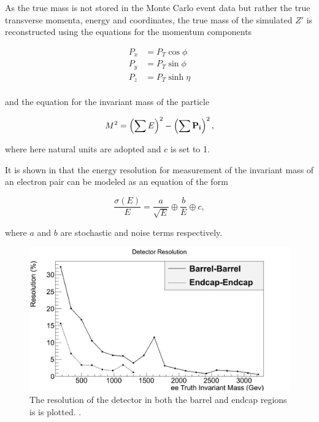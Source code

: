 \documentclass{article}
\begin{document}
As the true mass is not stored in the Monte Carlo event data but rather the true transverse momenta, energy and coordinates, the true mass of  the simulated $Z'$ is reconstructed using the equations for the momentum components

\begin{equation}
\begin{split}
P_x & = P_T \cos\phi \\
P_y & = P_T \sin\phi \\
P_z & = P_T\sinh\eta \\
\end{split}
\end{equation}

and the equation for the invariant mass of the particle

\begin{equation}
M^2 = \left(\sum E\right)^2 - \left(\sum \bf{P}_i\right)^2,
\end{equation}

where here natural units are adopted and $c$ is set to 1. 

It is shown in \cite{ATLASResolutionEquation} that the energy resolution for measurement of the invariant mass of an electron pair can be modeled as an equation of the form

\begin{equation}
\frac{\sigma(E)}{E} = \frac{a}{\sqrt{E}} \oplus \frac{b}{E} \oplus c,
\end{equation}

where $a$ and $b$ are stochastic and noise terms respectively.

\begin{figure}[h]
    \centering \includegraphics[scale=0.3]{images/resolution.png} \caption{ The resolution of the detector in both the barrel and endcap regions is  is plotted.  \label{fig:Resolution}.}
\end{figure}
\end{document}
